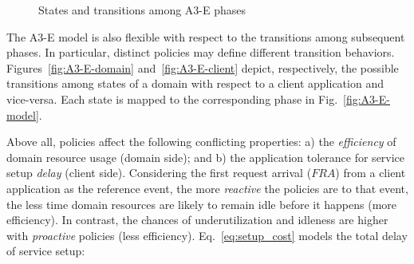 \begin{figure}[tbp]
	\raggedright
	\hfill
	
	\hfill
	\caption{States and transitions among A3-E phases} \label{fig:A3-E-states}
\end{figure}


The A3-E model is also flexible with respect to the transitions among subsequent phases. In particular, distinct policies may define different transition behaviors. Figures~\ref{fig:A3-E-domain} and~\ref{fig:A3-E-client} depict, respectively, the possible transitions among states of a domain with respect to a client application and vice-versa. Each state is mapped to the corresponding phase in Fig.~\ref{fig:A3-E-model}. 

Above all, policies affect the following conflicting properties: a) the \textit{efficiency} of domain resource usage (domain side); and b) the application tolerance for service setup \textit{delay} (client side). Considering the first request arrival ($FRA$) from a client application as the reference event, the more \textit{reactive} the policies are to that event, the less time domain resources are likely to remain idle before it happens (more efficiency). In contrast, the chances of underutilization and idleness are higher with \textit{proactive} policies (less efficiency). Eq.~\ref{eq:setup_cost} models the total delay of service setup:

